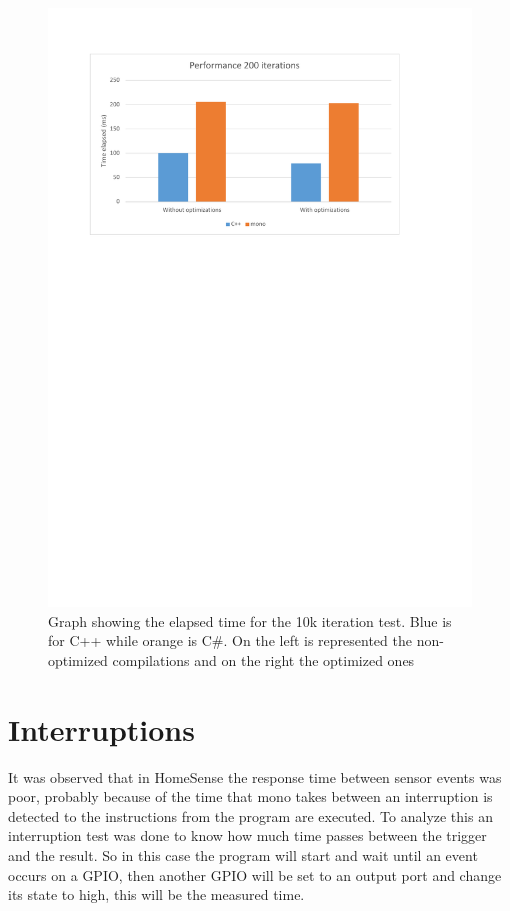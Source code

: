 \begin{figure}[H]\begin{center}
 \centering
  \captionsetup{justification=centering}
  \includegraphics[scale=0.9,page=2]{pictures/performance-tests/GPIO/graphs}
  \caption{Graph showing the elapsed time for the 10k iteration test. Blue is for C++ while orange is C\#. On the left is represented the non-optimized compilations and on the right the optimized ones\label{fig:gpio-graph-10k}}
\end{center}\end{figure}

\section{Interruptions}\label{SS:IOEx-Interruptions}
It was observed that in HomeSense the response time between sensor events was poor, probably because of the time that mono takes between an interruption is detected to the instructions from the program are executed. To analyze this an interruption test was done to know how much time passes between the trigger and the result. So in this case the program will start and wait until an event occurs on a GPIO, then another GPIO will be set to an output port and change its state to high, this will be the measured time.
\\
